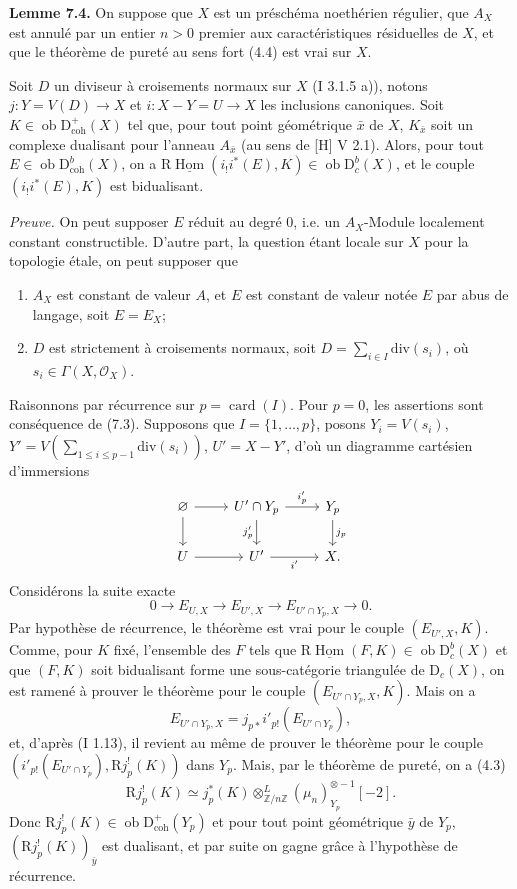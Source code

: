 \documentclass[11pt]{article}
\DeclareMathOperator{\Hom}{Hom}
\newcommand{\R}{\mathrm{R}}
\newcommand{\D}{\mathrm{D}}
\newcommand{\Z}{\mathbb{Z}}
\newcommand{\ob}{\operatorname{ob}}
\providecommand{\Hom}{\operatorname{Hom}}
\providecommand{\ob}{\operatorname{ob}}
\providecommand{\R}{\mathrm R}
\providecommand{\Z}{\mathbb Z}
\begin{document}
\textbf{Lemme 7.4.} On suppose que $X$ est un préschéma noethérien régulier, que $A_X$ est annulé par un entier $n>0$ premier aux caractéristiques résiduelles de $X$, et que le théorème de pureté au sens fort (4.4) est vrai sur $X$.

Soit $D$ un diviseur à croisements normaux sur $X$ (I 3.1.5 a)), notons $j:Y=V(D)\to X$ et $i:X-Y=U\to X$ les inclusions canoniques. Soit $K\in\ob\D^{+}_{\mathrm{coh}}(X)$ tel que, pour tout point géométrique $\bar{x}$ de $X$, $K_{\bar{x}}$ soit un complexe dualisant pour l'anneau $A_{\bar{x}}$ (au sens de [H] V 2.1). Alors, pour tout $E\in\ob\D^{b}_{\mathrm{coh}}(X)$, on a $\R\underline{\Hom}(i_!i^*(E),K)\in\ob\D^{b}_{c}(X)$, et le couple $(i_!i^*(E),K)$ est bidualisant.

\emph{Preuve.} On peut supposer $E$ réduit au degré $0$, i.e. un $A_X$-Module localement constant constructible. D'autre part, la question étant locale sur $X$ pour la topologie étale, on peut supposer que
\begin{enumerate}[label=(\alph*)]
\item $A_X$ est constant de valeur $A$, et $E$ est constant de valeur notée $E$ par abus de langage, soit $E=E_X$;
\item $D$ est strictement à croisements normaux, soit $D=\sum_{i\in I}\mathrm{div}(s_i)$, où $s_i\in\Gamma(X,\mathcal{O}_X)$.
\end{enumerate}
Raisonnons par récurrence sur $p=\operatorname{card}(I)$. Pour $p=0$, les assertions sont conséquence de (7.3). Supposons que $I=\{1,\ldots,p\}$, posons $Y_i=V(s_i)$, $Y'=V(\sum_{1\leq i\leq p-1}\mathrm{div}(s_i))$, $U'=X-Y'$, d'où un diagramme cartésien d'immersions
\[
\begin{tikzcd}
\varnothing \arrow[r] \arrow[d] & U'\cap Y_p \arrow[r,"i'_p"] \arrow[d,"j'_p"'] & Y_p \arrow[d,"j_p"]\\
U \arrow[r] & U' \arrow[r,"i'"'] & X.
\end{tikzcd}
\]
Considérons la suite exacte
\[
        0\longrightarrow E_{U,X}\longrightarrow E_{U',X}\longrightarrow E_{U'\cap Y_p,X}\longrightarrow0.
\]
Par hypothèse de récurrence, le théorème est vrai pour le couple $(E_{U',X},K)$. Comme, pour $K$ fixé, l'ensemble des $F$ tels que $\R\underline{\Hom}(F,K)\in\ob\D_c^b(X)$ et que $(F,K)$ soit bidualisant forme une sous-catégorie triangulée de $\D_c(X)$, on est ramené à prouver le théorème pour le couple $(E_{U'\cap Y_p,X},K)$. Mais on a
\[
        E_{U'\cap Y_p,X}=j_{p*}i'_{p!}(E_{U'\cap Y_p}),
\]
et, d'après (I 1.13), il revient au même de prouver le théorème pour le couple $(i'_{p!}(E_{U'\cap Y_p}),\R j_p^!(K))$ dans $Y_p$. Mais, par le théorème de pureté, on a (4.3)
\[
        \R j_p^!(K)\simeq j_p^*(K)\otimes^L_{\Z/n\Z}(\mu_n)_{Y_p}^{\otimes -1}[-2].
\]
Donc $\R j_p^!(K)\in\ob\D^{+}_{\mathrm{coh}}(Y_p)$ et pour tout point géométrique $\bar{y}$ de $Y_p$, $(\R j_p^!(K))_{\bar{y}}$ est dualisant, et par suite on gagne grâce à l'hypothèse de récurrence.
\end{document}
